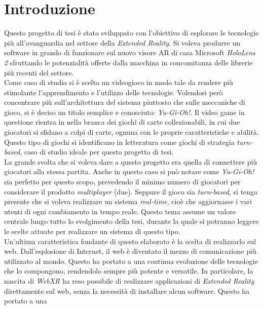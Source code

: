 \chapter{Introduzione}

Questo progetto di tesi è stato sviluppato con l'obiettivo di esplorare le tecnologie più all'avanguardia nel settore della \textit{Extended Reality}. Si voleva produrre un software
in grando di funzionare sul nuovo visore AR di casa Microsoft \textit{HoloLens 2} sfruttando le potenzialità offerte dalla macchina in concomitanza delle librerie più recenti
del settore.\\
\newline
Come caso di studio si è scelto un videogioco in modo tale da rendere più stimolante l'apprendimento e l'utilizzo delle tecnologie. Volendosi però concentrare più sull'architettura
del sistema piuttosto che sulle meccaniche di gioco, si è deciso un titolo semplice e conosciuto: \textit{Yu-Gi-Oh!}. Il video game in questione rientra in nella branca dei giochi di
carte collezionabili, in cui due giocatori si sfidano a colpi di carte, ognuna con le proprie caratteristiche e abilità. Questo tipo di giochi si identificano in letteratura come
giochi di strategia \textit{turn-based}, caso di studio ideale per questo progetto di tesi.\\
\newline
La grande svolta che si voleva dare a questo progetto era quella di connettere più giocatori alla stessa partita. Anche in questo caso si può notare come \textit{Yu-Gi-Oh!} sia 
perfetto per questo scopo, prevedendo il minimo numero di giocatori per considerare il prodotto \textit{multiplayer} (due). Seppure il gioco sia \textit{turn-based}, si tenga presente
che si voleva realizzare un sistema \textit{real-time}, cioè che aggiornasse i vari utenti di ogni cambiamento in tempo reale. Questo tema assume un valore centrale lungo tutto lo
svolgimento della tesi, durante la quale si potranno leggere le scelte attuate per realizzare un sistema di questo tipo.\\
\newline
Un'ultima caratteristica fondante di questo elaborato è la scelta di realizzarlo sul web. Dall'esplosione di Internet, il web è diventato il mezzo di comunicazione più utilizzato
al mondo. Questo ha portato a una continua evoluzione delle tecnologie che lo compongono, rendendolo sempre più potente e versatile. In particolare, la nascita di \textit{WebXR} ha
reso possibile di realizzare applicazioni di \textit{Extended Reality} direttamente sul web, senza la necessità di installare alcun software. Questo ha portato a una
